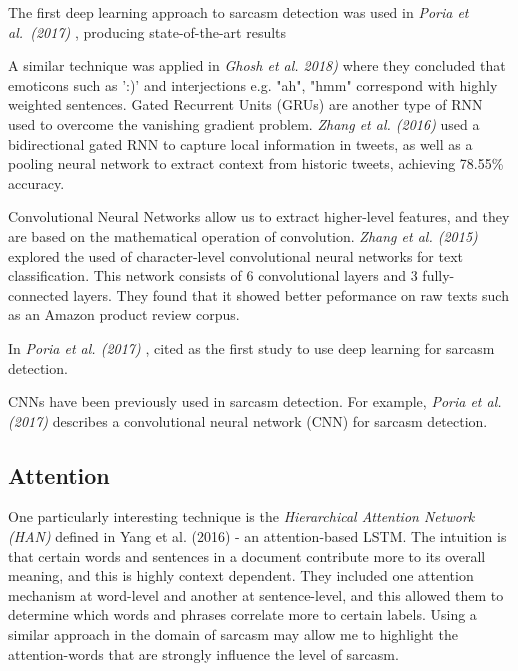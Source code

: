 \documentclass[12pt,a4paper]{article}
\begin{document}
The first deep learning approach to sarcasm detection was used in \textit{Poria et al.\ (2017)} \cite{poria2016deeper}, producing state-of-the-art results


 A similar technique was applied in \textit{Ghosh et al. 2018)} \cite{ghosh2018sarcasm} where they concluded that emoticons such as ':)' and interjections e.g. "ah", "hmm" correspond with highly weighted sentences. Gated Recurrent Units (GRUs) are another type of RNN used to overcome the vanishing gradient problem.  \textit{Zhang et al. (2016)} \cite{zhang2016tweet} used a bidirectional gated RNN to capture local information in tweets, as well as a pooling neural network to extract context from historic tweets, achieving 78.55\% accuracy.

Convolutional Neural Networks allow us to extract higher-level features, and they are based on the mathematical operation of convolution. \textit{Zhang et al. (2015)}  \cite{zhang2015character} explored the used of character-level convolutional neural networks for text classification. This network consists of 6 convolutional layers and 3 fully-connected layers. They found that it showed better peformance on raw texts such as an Amazon product review corpus.

In \textit{Poria et al. (2017)} \cite{poria2016deeper}, cited as the first study to use deep learning for sarcasm detection.


CNNs have been previously used in sarcasm detection. For example, \textit{Poria et al. (2017)} \cite{poria2016deeper} describes a convolutional neural network (CNN) for sarcasm detection. \\

\subsection{Attention}\vspace{-10pt}
One particularly interesting technique is the \textit{Hierarchical Attention Network (HAN)} defined in Yang et al. (2016) \cite{yang2016hierarchical} - an attention-based LSTM. The intuition is that certain words and sentences in a document contribute more to its overall meaning, and this is highly context dependent. They included one attention mechanism at word-level and another at sentence-level, and this allowed them to determine which words and phrases correlate more to certain labels. Using a similar approach in the domain of sarcasm may allow me to highlight the attention-words that are strongly influence the level of sarcasm.
\end{document}
